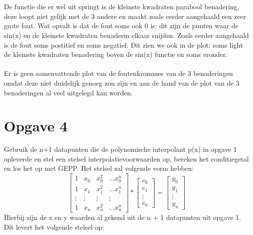 \documentclass[10pt,a4paper]{article}
\begin{document}
\\
\\
De functie die er wel uit springt is de kleinste kwadraten parabool benadering, deze loopt niet gelijk met de 3 andere en maakt zoals eerder aangehaald een zeer grote fout. Wat opvalt is dat de fout soms ook 0 is: dit zijn de punten waar de sin(x) en de kleinste kwadraten benaderin elkaar snijden. Zoals eerder aangehaald is de fout soms postitief en soms negatief. Dit zien we ook in de plot: soms light de kleinste kwadraten benadering boven de sin(x) functie en soms eronder.
\\
\\
Er is geen samenvattende plot van de foutenkrommes van de 3 benaderingen omdat deze niet duidelijk genoeg zou zijn en aan de hand van de plot van de 3 benaderingen al veel uitgelegd kan worden.
\section{Opgave 4}
Gebruik de n+1 datapunten die de polynomische interpolant p(x) in opgave 1 opleverde en stel een stelsel interpolatievoorwaarden op, bereken het conditiegetal en los het op met GEPP.
Het stelsel zal volgende vorm hebben:
$$
\begin{bmatrix}
1 & x_{0} & x_{0}^{2} & \hdots x_{0}^{n}  \\
1 & x_{1} & x_{1}^{2} & \hdots x_{1}^{n}\\
\vdots & \vdots & \vdots & \vdots \\
1 & x_{n} & x_{n}^{2} & \hdots x_{n}^{n}
\end{bmatrix}
*
\begin{bmatrix}
c_{0} \\
c_{1}\\
\vdots \\
c_{n}
\end{bmatrix}
=
\begin{bmatrix}
y_{0} \\
y_{1}\\
\vdots \\
y_{n}
\end{bmatrix}
$$
Hierbij zijn de x en y waarden al gekend uit de n + 1 datapunten uit opgave 1. Dit levert het volgende stelsel op:
\\
\\
\end{document}
